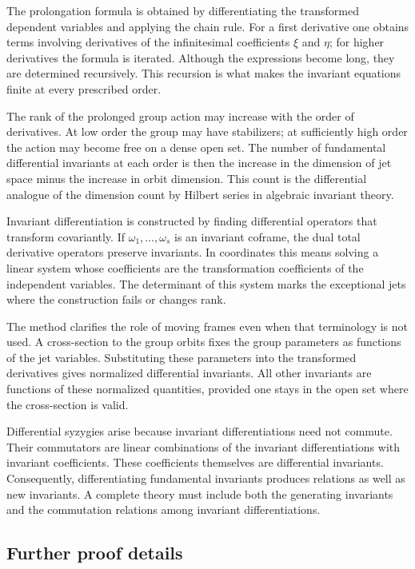 \documentclass[11pt]{article}
\begin{document}
The prolongation formula is obtained by differentiating the transformed dependent variables and
applying the chain rule. For a first derivative one obtains terms involving derivatives of the
infinitesimal coefficients \(\xi\) and \(\eta\); for higher derivatives the formula is iterated.
Although the expressions become long, they are determined recursively. This recursion is what makes
the invariant equations finite at every prescribed order.

The rank of the prolonged group action may increase with the order of derivatives. At low order the
group may have stabilizers; at sufficiently high order the action may become free on a dense open
set. The number of fundamental differential invariants at each order is then the increase in the
dimension of jet space minus the increase in orbit dimension. This count is the differential
analogue of the dimension count by Hilbert series in algebraic invariant theory.

Invariant differentiation is constructed by finding differential operators that transform
covariantly. If \(\omega_1,\ldots,\omega_s\) is an invariant coframe, the dual total derivative
operators preserve invariants. In coordinates this means solving a linear system whose coefficients
are the transformation coefficients of the independent variables. The determinant of this system
marks the exceptional jets where the construction fails or changes rank.

The method clarifies the role of moving frames even when that terminology is not used. A
cross-section to the group orbits fixes the group parameters as functions of the jet variables.
Substituting these parameters into the transformed derivatives gives normalized differential
invariants. All other invariants are functions of these normalized quantities, provided one stays in
the open set where the cross-section is valid.

Differential syzygies arise because invariant differentiations need not commute. Their commutators
are linear combinations of the invariant differentiations with invariant coefficients. These
coefficients themselves are differential invariants. Consequently, differentiating fundamental
invariants produces relations as well as new invariants. A complete theory must include both the
generating invariants and the commutation relations among invariant differentiations.


\subsection{Further proof details}
\end{document}
